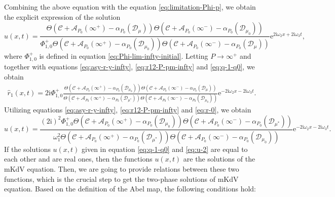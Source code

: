 \documentclass[11pt,reqno]{amsart}
\newcommand{\ii}{\mathrm{i}}
\newcommand{\ee}{\mathrm{e}}
\numberwithin{equation}{section}
\begin{document}
Combining the above equation with the equation \eqref{eq:limitation-Phi-p}, we obtain the explicit expression of the solution 
\begin{equation}\label{eq:q-1-q0}
	u(x,t)= \frac{\Theta(\mathcal{C}+\mathcal{A}_{P_0}(\infty^{+})-\alpha_{P_0}(\mathcal{D}_{\mu}))\Theta(\mathcal{C}+\mathcal{A}_{P_0}(\infty^{-})-\alpha_{P_0}(\mathcal{D}_{\mu_0}))}{\Phi_{1,0}^{+}\Theta(\mathcal{C}+\mathcal{A}_{P_0}(\infty^{+})-\alpha_{P_0}(\mathcal{D}_{\mu_0}))\Theta(\mathcal{C}+\mathcal{A}_{P_0}(\infty^{-})-\alpha_{P_0}(\mathcal{D}_{\mu}))}\ee^{2\ii \omega_2 x+2\ii \omega_3 t},
\end{equation}
where $\Phi_{1,0}^{+}$ is defined in equation \eqref{eq:Phi-lim-infty-initial}.
Letting $P \rightarrow \infty^{+}$ and together with equations \eqref{eq:asy-r-y-infty}, \eqref{eq:r12-P-pm-infty} and \eqref{eq:q-1-q0}, we obtain
\begin{equation}\label{eq:r-0}
	\begin{split}
		\hat{r}_1(x,t)=
		2\ii\Phi_{1,0}^{+}\frac{ \Theta(\mathcal{C}+\mathcal{A}_{P_0}(\infty^{+})-\alpha_{P_0}(\mathcal{D}_{\mu_0}))\Theta(\mathcal{C}+\mathcal{A}_{P_0}(\infty^{-})-\alpha_{P_0}(\mathcal{D}_{\mu}))}
		{\Theta(\mathcal{C}+\mathcal{A}_{P_0}(\infty^{+})-\alpha_{P_0}(\mathcal{D}_{\mu^*}))\Theta(\mathcal{C}+\mathcal{A}_{P_0}(\infty^{-})-\alpha_{P_0}(\mathcal{D}_{\mu_0}))}\ee^{-2\ii \omega_2 x-2\ii \omega_3 t}.
	\end{split}
\end{equation}
Utilizing equations \eqref{eq:asy-r-y-infty}, \eqref{eq:r12-P-pm-infty} and \eqref{eq:r-0}, we obtain 
\begin{equation}\label{eq:u-2}
	\!\! u(x,t)=\frac{(2\ii)^2\Phi_{1,0}^{+} \Theta(\mathcal{C}+\mathcal{A}_{P_0}(\infty^{+})-\alpha_{P_0}(\mathcal{D}_{\mu_0}))\Theta(\mathcal{C}+\mathcal{A}_{P_0}(\infty^{-})-\alpha_{P_0}(\mathcal{D}_{\mu^*}))}{\omega_1^2\Theta(\mathcal{C}+\mathcal{A}_{P_0}(\infty^{+})-\alpha_{P_0}(\mathcal{D}_{\mu^*}))\Theta(\mathcal{C}+\mathcal{A}_{P_0}(\infty^{-})-\alpha_{P_0}(\mathcal{D}_{\mu_0}))}\ee^{-2\ii \omega_2 x-2\ii \omega_3 t}.
\end{equation}
If the solutions $u(x,t)$ given in equation \eqref{eq:q-1-q0} and \eqref{eq:u-2} are equal to each other and are real ones, then the functions $u(x,t)$ are the solutions of the mKdV equation. 
Then, we are going to provide relations between these two functions, which is the crucial step to get the two-phase solutions of mKdV equation.
Based on the definition of the Abel map, the following conditions hold:
\end{document}
